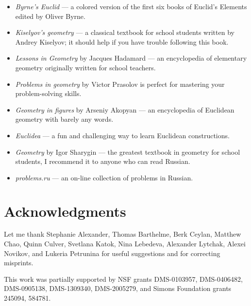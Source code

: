 \begin{itemize}
\item {}\emph{Byrne's Euclid} \cite{byrne} --- a colored version of the first six books of Euclid's Elements edited by Oliver Byrne. 

\item {}\emph{Kiselyov's geometry} \cite{kiselev} ---
a classical textbook for school students written by Andrey Kiselyov; it should help if you have trouble following this book.

\item {}\emph{Lessons in Geometry} by Jacques Hadamard \cite{hadamard} --- an encyclopedia of elementary geometry originally written for school teachers.



\item {}\emph{Problems in geometry} by Victor Prasolov\cite{prasolov}  is perfect for mastering your problem-solving skills.

\item {}\emph{Geometry in figures} by Arseniy Akopyan \cite{akopyan} --- an encyclopedia of Euclidean geometry with barely any words.

\item {}\emph{Euclidea} \cite{euclidea} --- a fun and challenging way to learn Euclidean constructions.
 
\item {}\emph{Geometry} by Igor Sharygin \cite{sharygin} --- the greatest textbook in geometry for school students, I recommend it to anyone who can read Russian.

\item {}\emph{problems.ru} \cite{zadachi} --- an on-line collection of problems in Russian.

\end{itemize}

\section{Acknowledgments}

{\sloppy

Let me thank 
Stephanie Alexander,
Thomas Barthelme,
Berk Ceylan,
Matthew Chao, 
Quinn Culver,
Svetlana Katok, 
Nina Lebedeva,
Alexander Lytchak,
Alexei Novikov,
and Lukeria Petrunina
for useful suggestions and for correcting misprints.

This work was partially supported by
NSF grants
DMS-0103957,
DMS-0406482,
DMS-0905138,
DMS-1309340,
DMS-2005279,
and Simons Foundation grants 
245094, 584781.

}

